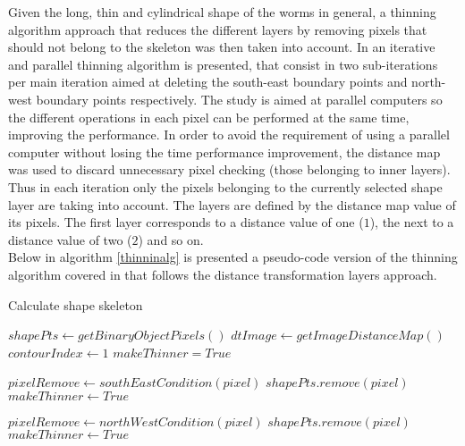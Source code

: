 Given the long, thin and cylindrical shape of the worms in general, a thinning algorithm
approach that reduces the different layers by removing pixels that should not 
belong to the skeleton was then taken into account. In \cite{thinning} an iterative and 
parallel thinning algorithm is presented, that consist in two sub-iterations per main 
iteration aimed at deleting the south-east boundary points and north-west boundary points 
respectively. The study is aimed at parallel computers so the different operations
in each pixel can be performed at the same time, improving the performance. In order
to avoid the requirement of using a parallel computer without losing the time performance 
improvement, the distance map was used to discard unnecessary pixel checking (those
belonging to inner layers). Thus in each iteration only the pixels belonging to the
currently selected shape layer are taking into account. The layers are defined by the
distance map value of its pixels. The first layer corresponds to a distance value
of one ($1$), the next to a distance value of two ($2$) and so on.\\

Below in algorithm \ref{thinninalg} is presented a pseudo-code 
version of the thinning algorithm covered in \cite{thinning} that follows 
the distance transformation layers approach.

\begin{algorithm}                     
\caption{Calculate shape skeleton}         
\label{thinninalg}                    
\begin{algorithmic}                   
\STATE $shapePts \leftarrow getBinaryObjectPixels()$
\STATE $dtImage \leftarrow getImageDistanceMap()$
\STATE $contourIndex \leftarrow 1$
\STATE $makeThinner = True$


\STATE {}
\STATE {}
\ELSE
\STATE $pixelRemove \leftarrow southEastCondition(pixel)$
\STATE $shapePts.remove(pixel)$
\STATE $makeThinner \leftarrow True$
\ENDIF

\ENDIF
\ENDFOR

\STATE {}
\STATE {}
\ELSE
\STATE $pixelRemove \leftarrow northWestCondition(pixel)$
\STATE $shapePts.remove(pixel)$
\STATE $makeThinner \leftarrow True$
\ENDIF
\ENDIF
\ENDFOR
\ENDWHILE
\STATE 
{}

\end{algorithmic}
\end{algorithm}


